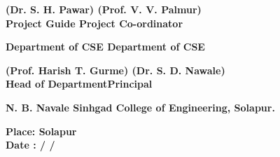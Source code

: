 \documentclass[12pt,a4paper,oneside]{report}
\begin{document}
\vspace{1.5cm}
\begin{center}
{\textbf{(Dr. S. H. Pawar) \hspace*{4.5cm} (Prof. V. V. Palmur) \\ \hspace*{1cm} Project Guide\hspace*{5.5cm} Project Co-ordinator}}
\end{center}
\vspace*{-0.2cm}
{\textbf{\hspace*{0.8cm}Department of CSE \hspace*{5.4cm} Department of CSE}
\vspace{1.0cm}
\begin{center}
{\textbf{(Prof. Harish T. Gurme) \hspace*{4.5cm} (Dr. S. D. Nawale) \\ \hspace*{-0.8cm} Head of Department\hspace*{6.2cm}Principal}}
\end{center}

\vspace{0.4cm}
\begin{center}
{\textbf{N. B. Navale Sinhgad College of Engineering, Solapur.}}
\end{center}
\vspace{0.3cm}
{\textbf{Place: Solapur}} \\
{\textbf{Date : \hspace*{1cm} / \hspace*{1cm}  /    }}




}
\end{document}
